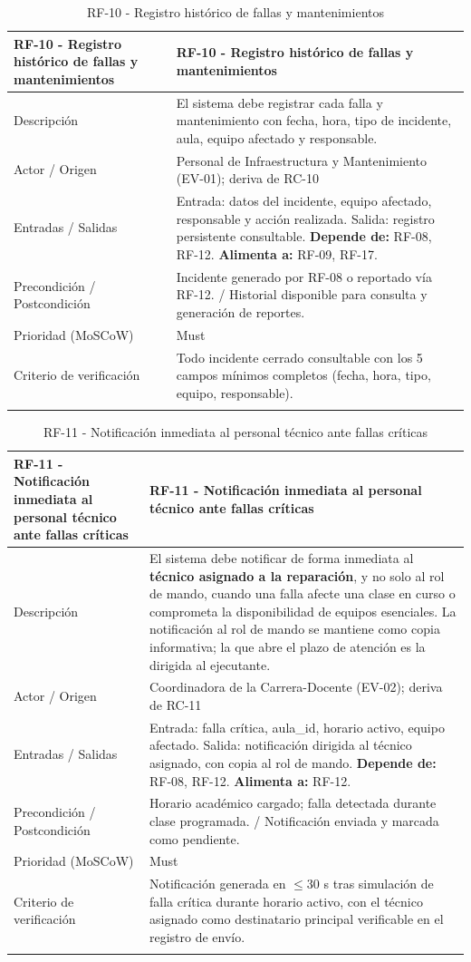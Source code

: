 \begingroup
\small
\begin{longtable}{|P{0.5000}|P{0.5000}|}
\hline
RF-10 - Registro histórico de fallas y mantenimientos & RF-10 - Registro histórico de fallas y mantenimientos \\ \hline
Descripción & El sistema debe registrar cada falla y mantenimiento con fecha, hora, tipo de incidente, aula, equipo afectado y responsable. \\ \hline
Actor / Origen & Personal de Infraestructura y Mantenimiento (EV-01); deriva de RC-10 \\ \hline
Entradas / Salidas & Entrada: datos del incidente, equipo afectado, responsable y acción realizada. Salida: registro persistente consultable. \textbf{Depende de:} RF-08, RF-12. \textbf{Alimenta a:} RF-09, RF-17. \\ \hline
Precondición / Postcondición & Incidente generado por RF-08 o reportado vía RF-12. / Historial disponible para consulta y generación de reportes. \\ \hline
Prioridad (MoSCoW) & Must \\ \hline
Criterio de verificación & Todo incidente cerrado consultable con los 5 campos mínimos completos (fecha, hora, tipo, equipo, responsable). \\ \hline
\caption{RF-10 - Registro histórico de fallas y mantenimientos}
\end{longtable}
\endgroup

\begingroup
\small
\begin{longtable}{|P{0.5000}|P{0.5000}|}
\hline
RF-11 - Notificación inmediata al personal técnico ante fallas críticas & RF-11 - Notificación inmediata al personal técnico ante fallas críticas \\ \hline
Descripción & El sistema debe notificar de forma inmediata al \textbf{técnico asignado a la reparación}, y no solo al rol de mando, cuando una falla afecte una clase en curso o comprometa la disponibilidad de equipos esenciales. La notificación al rol de mando se mantiene como copia informativa; la que abre el plazo de atención es la dirigida al ejecutante. \\ \hline
Actor / Origen & Coordinadora de la Carrera-Docente (EV-02); deriva de RC-11 \\ \hline
Entradas / Salidas & Entrada: falla crítica, aula\_id, horario activo, equipo afectado. Salida: notificación dirigida al técnico asignado, con copia al rol de mando. \textbf{Depende de:} RF-08, RF-12. \textbf{Alimenta a:} RF-12. \\ \hline
Precondición / Postcondición & Horario académico cargado; falla detectada durante clase programada. / Notificación enviada y marcada como pendiente. \\ \hline
Prioridad (MoSCoW) & Must \\ \hline
Criterio de verificación & Notificación generada en $\leq$30 s tras simulación de falla crítica durante horario activo, con el técnico asignado como destinatario principal verificable en el registro de envío. \\ \hline
\caption{RF-11 - Notificación inmediata al personal técnico ante fallas críticas}
\end{longtable}
\endgroup


